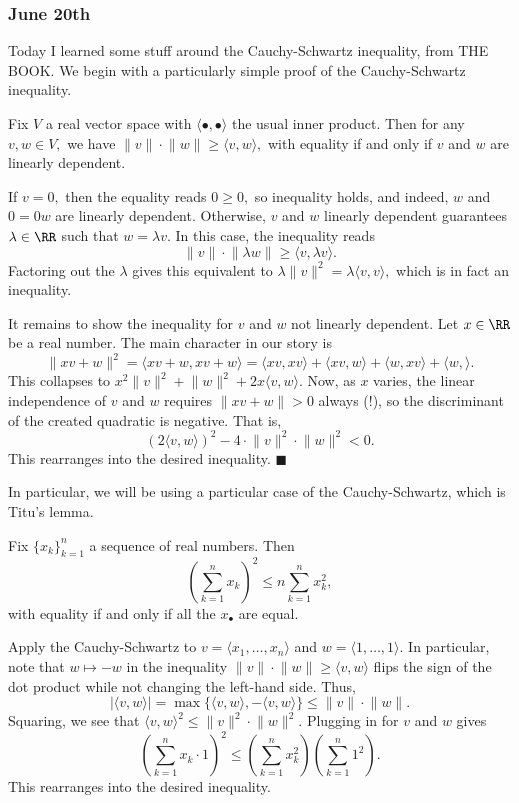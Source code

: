 \subsubsection{June 20th}
Today I learned some stuff around the Cauchy-Schwartz inequality, from THE BOOK. We begin with a particularly simple proof of the Cauchy-Schwartz inequality.
\begin{theorem}
    Fix $V$ a real vector space with $\langle\bullet,\bullet\rangle$ the usual inner product. Then for any $v,w\in V,$ we have $\lVert v\rVert\cdot\lVert w\rVert\ge\langle v,w\rangle,$ with equality if and only if $v$ and $w$ are linearly dependent.
\end{theorem}
If $v=0,$ then the equality reads $0\ge0,$ so inequality holds, and indeed, $w$ and $0=0w$ are linearly dependent. Otherwise, $v$ and $w$ linearly dependent guarantees $\lambda\in\RR$ such that $w=\lambda v.$ In this case, the inequality reads
\[\lVert v\rVert\cdot\lVert\lambda w\rVert\ge\langle v,\lambda v\rangle.\]
Factoring out the $\lambda$ gives this equivalent to $\lambda\lVert v\rVert^2=\lambda\langle v,v\rangle,$ which is in fact an inequality.

It remains to show the inequality for $v$ and $w$ not linearly dependent. Let $x\in\RR$ be a real number. The main character in our story is
\[\lVert xv+w\rVert^2=\langle xv+w,xv+w\rangle=\langle xv,xv\rangle+\langle xv,w\rangle+\langle w,xv\rangle+\langle w,\rangle.\]
This collapses to $x^2\lVert v\rVert^2+\lVert w\rVert^2+2x\langle v,w\rangle.$ Now, as $x$ varies, the linear independence of $v$ and $w$ requires $\lVert xv+w\rVert>0$ always (!), so the discriminant of the created quadratic is negative. That is,
\[(2\langle v,w\rangle)^2-4\cdot\lVert v\rVert^2\cdot\lVert w\rVert^2<0.\]
This rearranges into the desired inequality. $\blacksquare$

In particular, we will be using a particular case of the Cauchy-Schwartz, which is Titu's lemma.
\begin{lemma}
    Fix $\{x_k\}_{k=1}^n$ a sequence of real numbers. Then
    \[\left(\sum_{k=1}^nx_k\right)^2\le n\sum_{k=1}^nx_k^2,\]
    with equality if and only if all the $x_\bullet$ are equal.
\end{lemma}
Apply the Cauchy-Schwartz to $v=\langle x_1,\ldots,x_n\rangle$ and $w=\langle 1,\ldots,1\rangle.$ In particular, note that $w\mapsto-w$ in the inequality $\lVert v\rVert\cdot\lVert w\rVert\ge\langle v,w\rangle$ flips the sign of the dot product while not changing the left-hand side. Thus,
\[|\langle v,w\rangle|=\max\{\langle v,w\rangle,-\langle v,w\rangle\}\le\lVert v\rVert\cdot\lVert w\rVert.\]
Squaring, we see that $\langle v,w\rangle^2\le\lVert v\rVert^2\cdot\lVert w\rVert^2.$ Plugging in for $v$ and $w$ gives
\[\left(\sum_{k=1}^nx_k\cdot1\right)^2\le\left(\sum_{k=1}^nx_k^2\right)\left(\sum_{k=1}^n1^2\right).\]
This rearranges into the desired inequality.

